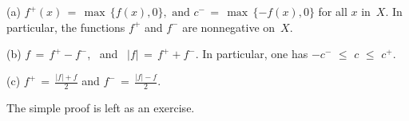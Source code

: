 {\V

        (a) $f^{+}(x) \,=\, {\max}\,\{f(x),0\}, \mbox{ and } c^{-} \,=\, {\max}\,\{-f(x),0\}$ for all $x$ in~$X$.
    In particular, the functions $f^{+}$ and $f^{-}$ are nonnegative on~$X$.

\V

        (b) $f \,=\, f^{+} - f^{-}$, \mbox{ and } $|f| \,=\, f^{+} + f^{-}$.
    In particular, one has  $-c^{-}\,\,{\leq}\,\,c\,\,{\leq}\,\,c^{+}$.


\V

        (c) ${\displaystyle f^{+} \,=\, \frac{|f|+f}{2}}$
    and ${\displaystyle f^{-} \,=\, \frac{|f|-f}{2}}$.

\V


\V

        The simple proof is left as an exercise.
}%

\V
\V


